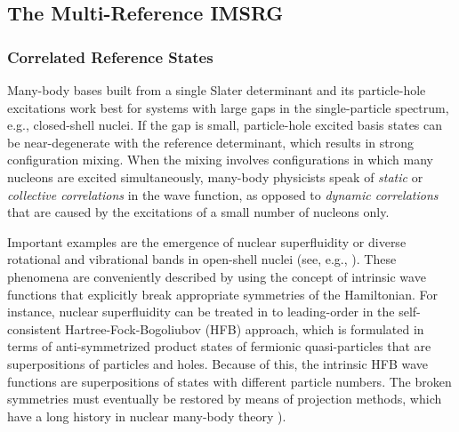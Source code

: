 {%
\subsection{\label{sec:current_mrimsrg}The Multi-Reference IMSRG}


%
%
\subsubsection{Correlated Reference States}
Many-body bases built from a single Slater determinant and its particle-hole
excitations work best for systems with large gaps in the single-particle 
spectrum, e.g., closed-shell nuclei. If the gap is small, particle-hole 
excited basis states can be near-degenerate with the reference determinant, 
which results in strong configuration mixing. When the mixing involves 
configurations in which many nucleons are excited simultaneously, many-body 
physicists speak of \emph{static} or \emph{collective correlations} in the 
wave function, as opposed to \emph{dynamic correlations} that are caused by 
the excitations of a small number of nucleons only. 

Important examples are the emergence of nuclear superfluidity \cite{Dean:2003ei}
or diverse rotational and vibrational bands in open-shell nuclei (see, e.g., \cite{Bohr:1999vn}).
These phenomena are conveniently described by using the concept of intrinsic
wave functions that explicitly break appropriate symmetries of the Hamiltonian.
For instance, nuclear superfluidity can be treated in to leading-order in 
the self-consistent Hartree-Fock-Bogoliubov (HFB) approach, which is formulated 
in terms of anti-symmetrized product states of fermionic quasi-particles that 
are superpositions of particles and holes. Because of this, the intrinsic HFB wave 
functions are superpositions of states with different particle numbers. The
broken symmetries must eventually be restored by means of projection methods,
which have a long history in nuclear many-body theory
\cite{Peierls:1973fk,Ring:1980bb,Egido:1982sd,Robledo:1994qf,Flocard:1997fx,Sheikh:2000xx,Dobaczewski:2007hh,Bender:2009rv,Duguet:2009ph,Lacroix:2009aj,Lacroix:2012vn,Duguet:2015ye}).

}
